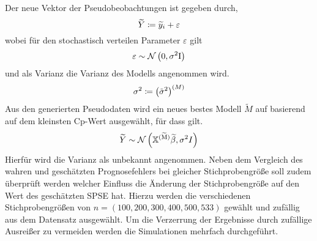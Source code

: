         Der neue Vektor der Pseudobeobachtungen ist gegeben durch,
        \[
            \widetilde{Y} \coloneqq \widetilde{y}_i + \varepsilon
        \]
        wobei für den stochastisch verteilen Parameter $\varepsilon$ gilt
        \[
            \varepsilon \sim \mathcal{N} \left( 0,\sigma^2\mathrm{I} \right)
        \]
        und als Varianz die Varianz des Modells angenommen wird.
        \[
            \sigma^2 \coloneqq \left( \tilde{\sigma}^2 \right)^{(M)}
        \]
        Aus den generierten Pseudodaten wird ein neues bestes Modell $\widetilde{M}$ auf basierend auf dem kleinsten Cp-Wert ausgewählt, für dass gilt.
        \[
            \widetilde{Y} \sim \mathcal{N} \left( \mathbb{X}^{\mathrm{(\widetilde{M})}}\widetilde{\beta}, \sigma^2 I \right)
        \]
        Hierfür wird die Varianz als unbekannt angenommen.
        Neben dem Vergleich des wahren und geschätzten Prognosefehlers bei gleicher Stichprobengröße soll zudem überprüft werden welcher Einfluss die Änderung der Stichprobengröße auf den Wert des geschätzten SPSE hat.
        Hierzu werden die verschiedenen Stichprobengrößen von $n = (100, 200, 300, 400, 500, 533)$ gewählt und zufällig aus dem Datensatz ausgewählt.
        Um die Verzerrung der Ergebnisse durch zufällige Ausreißer zu vermeiden werden die Simulationen mehrfach durchgeführt.


